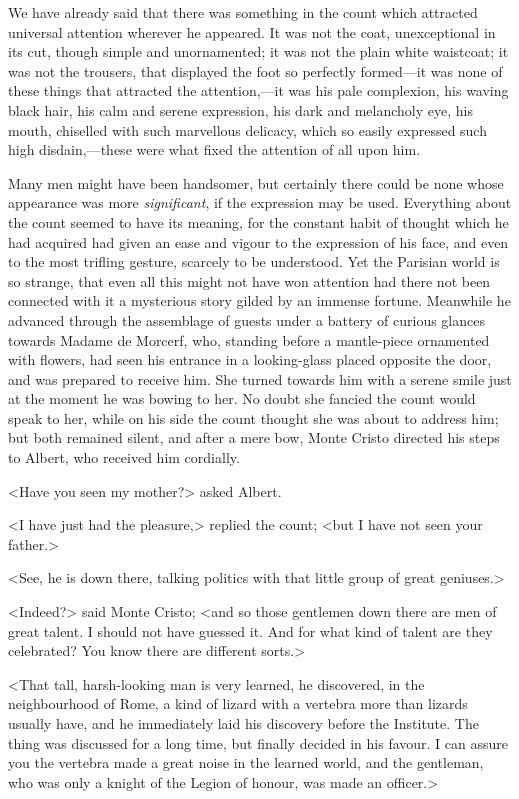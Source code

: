  We have already said that there was something in the count which attracted universal attention wherever he appeared. It was not the coat, unexceptional in its cut, though simple and unornamented; it was not the plain white waistcoat; it was not the trousers, that displayed the foot so perfectly formed—it was none of these things that attracted the attention,—it was his pale complexion, his waving black hair, his calm and serene expression, his dark and melancholy eye, his mouth, chiselled with such marvellous delicacy, which so easily expressed such high disdain,—these were what fixed the attention of all upon him. 

 Many men might have been handsomer, but certainly there could be none whose appearance was more \textit{significant}, if the expression may be used. Everything about the count seemed to have its meaning, for the constant habit of thought which he had acquired had given an ease and vigour to the expression of his face, and even to the most trifling gesture, scarcely to be understood. Yet the Parisian world is so strange, that even all this might not have won attention had there not been connected with it a mysterious story gilded by an immense fortune.  Meanwhile he advanced through the assemblage of guests under a battery of curious glances towards Madame de Morcerf, who, standing before a mantle-piece ornamented with flowers, had seen his entrance in a looking-glass placed opposite the door, and was prepared to receive him. She turned towards him with a serene smile just at the moment he was bowing to her. No doubt she fancied the count would speak to her, while on his side the count thought she was about to address him; but both remained silent, and after a mere bow, Monte Cristo directed his steps to Albert, who received him cordially. 

 <Have you seen my mother?> asked Albert. 

 <I have just had the pleasure,> replied the count; <but I have not seen your father.> 

 <See, he is down there, talking politics with that little group of great geniuses.> 

 <Indeed?> said Monte Cristo; <and so those gentlemen down there are men of great talent. I should not have guessed it. And for what kind of talent are they celebrated? You know there are different sorts.> 

 <That tall, harsh-looking man is very learned, he discovered, in the neighbourhood of Rome, a kind of lizard with a vertebra more than lizards usually have, and he immediately laid his discovery before the Institute. The thing was discussed for a long time, but finally decided in his favour. I can assure you the vertebra made a great noise in the learned world, and the gentleman, who was only a knight of the Legion of honour, was made an officer.> 

